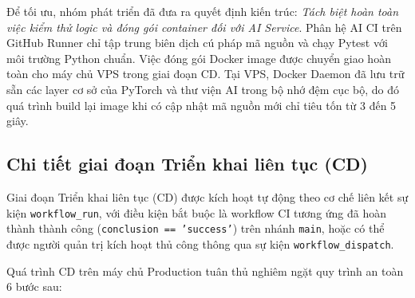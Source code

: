 Để tối ưu, nhóm phát triển đã đưa ra quyết định kiến trúc: \textit{Tách biệt hoàn toàn việc kiểm thử logic và đóng gói container đối với AI Service}. Phân hệ AI CI trên GitHub Runner chỉ tập trung biên dịch cú pháp mã nguồn và chạy Pytest với môi trường Python chuẩn. Việc đóng gói Docker image được chuyển giao hoàn toàn cho máy chủ VPS trong giai đoạn CD. Tại VPS, Docker Daemon đã lưu trữ sẵn các layer cơ sở của PyTorch và thư viện AI trong bộ nhớ đệm cục bộ, do đó quá trình build lại image khi có cập nhật mã nguồn mới chỉ tiêu tốn từ 3 đến 5 giây.

\subsection{Chi tiết giai đoạn Triển khai liên tục (CD)}

Giai đoạn Triển khai liên tục (CD) được kích hoạt tự động theo cơ chế liên kết sự kiện \texttt{workflow\_run}, với điều kiện bắt buộc là workflow CI tương ứng đã hoàn thành thành công (\texttt{conclusion == 'success'}) trên nhánh \texttt{main}, hoặc có thể được người quản trị kích hoạt thủ công thông qua sự kiện \texttt{workflow\_dispatch}.

Quá trình CD trên máy chủ Production tuân thủ nghiêm ngặt quy trình an toàn 6 bước sau:

